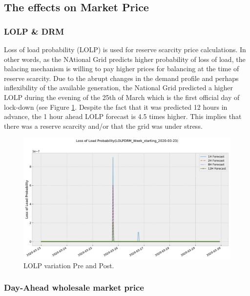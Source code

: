 \documentclass[energies,article,submit,moreauthors,pdftex]{Definitions/mdpi}
\begin{document}
\subsection{The effects on Market Price}\label{section:Market price}

\subsubsection{LOLP \& DRM}\label{section:LOLP_DRM}

Loss of load probability (LOLP) is used for reserve scarcity price calculations. In other words, as the NAtional Grid predicts higher probability of loss of load, the balacing mechanism is willing to pay higher prices for balancing at the time of reserve scarcity. Due to the abrupt changes in the demand profile and perhaps inflexibility of the available generation, the National Grid predicted a higher LOLP during the evening of the 25th of March which is the first official day of lock-down (see Figure \ref{fig:LOLP_25_03}. Despite the fact that it was predicted 12 hours in advance, the 1 hour ahead LOLP forecast is 4.5 times higher. This implies that there was a reserve scarcity and/or that the grid was under stress.

\begin{figure}[H]\centering
\hspace{-25pt}\includegraphics[width=15 cm]{Graphics/LOLPDRM_Week_starting_2020-03-23no4H.pdf}
\caption{LOLP variation Pre and Post.}\label{fig:LOLP_25_03}
\end{figure}  
\subsubsection{Day-Ahead wholesale market price}\label{sec:day-ahead wholesale market price}
\end{document}
